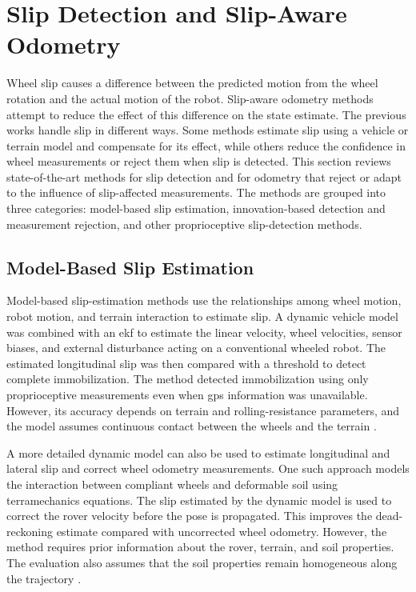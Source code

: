 \documentclass[report.tex]{subfiles}
\begin{document}
\section{Slip Detection and Slip-Aware Odometry}
\label{sec:sota_slip}

    Wheel slip causes a difference between the predicted motion from the wheel rotation and the actual motion of the robot. Slip-aware odometry methods attempt to reduce the effect of this difference on the state estimate. The previous works handle slip in different ways. Some methods estimate slip using a vehicle or terrain model and compensate for its effect, while others reduce the confidence in wheel measurements or reject them when slip is detected. This section reviews state-of-the-art methods for slip detection and for odometry that reject or adapt to the influence of slip-affected measurements. The methods are grouped into three categories: model-based slip estimation, innovation-based detection and measurement rejection, and other proprioceptive slip-detection methods.

    \subsection{Model-Based Slip Estimation}
    \label{subsec:sota_model_slip}

    Model-based slip-estimation methods use the relationships among wheel motion, robot motion, and terrain interaction to estimate slip. A dynamic vehicle model was combined with an \gls{ekf} to estimate the linear velocity, wheel velocities, sensor biases, and external disturbance acting on a conventional wheeled robot. The estimated longitudinal slip was then compared with a threshold to detect complete immobilization. The method detected immobilization using only proprioceptive measurements even when \gls{gps} information was unavailable. However, its accuracy depends on terrain and rolling-resistance parameters, and the model assumes continuous contact between the wheels and the terrain \cite{Ward2008}.

    A more detailed dynamic model can also be used to estimate longitudinal and lateral slip and correct wheel odometry measurements. One such approach models the interaction between compliant wheels and deformable soil using terramechanics equations. The slip estimated by the dynamic model is used to correct the rover velocity before the pose is propagated. This improves the dead-reckoning estimate compared with uncorrected wheel odometry. However, the method requires prior information about the rover, terrain, and soil properties. The evaluation also assumes that the soil properties remain homogeneous along the trajectory \cite{Gargiulo2021}.
\end{document}
